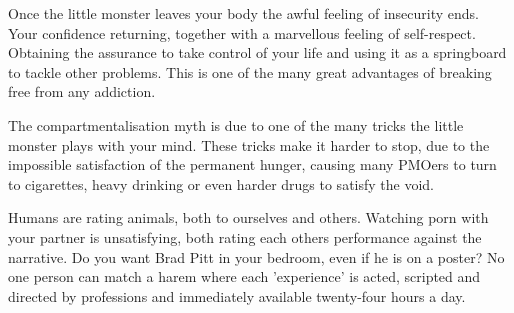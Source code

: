 \documentclass[easypeasy.tex]{subfiles}
\begin{document}
Once the little monster leaves your body the awful feeling of insecurity ends. Your confidence returning, together with a marvellous feeling of self-respect. Obtaining the assurance to take control of your life and using it as a springboard to tackle other problems. This is one of the many great advantages of breaking free from any addiction.

The compartmentalisation myth is due to one of the many tricks the little monster plays with your mind. These tricks make it harder to stop, due to the impossible satisfaction of the permanent hunger, causing many PMOers to turn to cigarettes, heavy drinking or even harder drugs to satisfy the void.

Humans are rating animals, both to ourselves and others. Watching porn with your partner is unsatisfying, both rating each others performance against the narrative. Do you want Brad Pitt in your bedroom, even if he is on a poster? No one person can match a harem where each 'experience' is acted, scripted and directed by professions and immediately available twenty-four hours a day.
\end{document}
